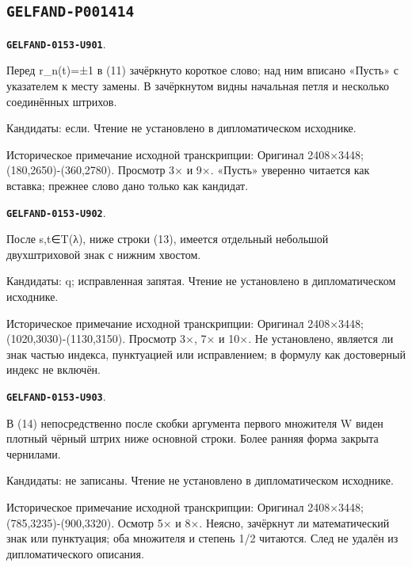 \documentclass[11pt]{article}
\theoremstyle{definition}
\theoremstyle{remark}
\begin{document}
\subsection*{\texttt{GELFAND-P001414}}
\par\noindent\leavevmode{}\label{GELFAND-0153-U901}\label{GELFAND-P001414:eq11-cancelled-word:note}\textbf{\texttt{GELFAND-0153-U901}}.\nopagebreak[4]\par
Перед r\_n(t)=±1 в (11) зачёркнуто короткое слово; над ним вписано «Пусть» с указателем к месту замены. В зачёркнутом видны начальная петля и несколько соединённых штрихов.\par
Кандидаты: если. Чтение не установлено в дипломатическом исходнике.\par
Историческое примечание исходной транскрипции: Оригинал 2408×3448; (180,2650)-(360,2780). Просмотр 3× и 9×. «Пусть» уверенно читается как вставка; прежнее слово дано только как кандидат.\par\medskip
\par\noindent\leavevmode{}\label{GELFAND-0153-U902}\label{GELFAND-P001414:eq13-terminal-mark:note}\textbf{\texttt{GELFAND-0153-U902}}.\nopagebreak[4]\par
После s,t∈T(λ), ниже строки (13), имеется отдельный небольшой двухштриховой знак с нижним хвостом.\par
Кандидаты: q; исправленная запятая. Чтение не установлено в дипломатическом исходнике.\par
Историческое примечание исходной транскрипции: Оригинал 2408×3448; (1020,3030)-(1130,3150). Просмотр 3×, 7× и 10×. Не установлено, является ли знак частью индекса, пунктуацией или исправлением; в формулу как достоверный индекс не включён.\par\medskip
\par\noindent\leavevmode{}\label{GELFAND-0153-U903}\label{GELFAND-P001414:eq14-blotted-mark:note}\textbf{\texttt{GELFAND-0153-U903}}.\nopagebreak[4]\par
В (14) непосредственно после скобки аргумента первого множителя W виден плотный чёрный штрих ниже основной строки. Более ранняя форма закрыта чернилами.\par
Кандидаты: не записаны. Чтение не установлено в дипломатическом исходнике.\par
Историческое примечание исходной транскрипции: Оригинал 2408×3448; (785,3235)-(900,3320). Осмотр 5× и 8×. Неясно, зачёркнут ли математический знак или пунктуация; оба множителя и степень 1/2 читаются. След не удалён из дипломатического описания.\par\medskip
\end{document}
